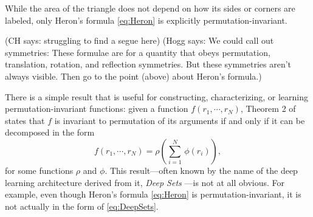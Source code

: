 \documentclass[12pt]{article}
\newcommand{\CH}[1]{{\color{blue} (CH says: #1)}}
\newcommand{\Hogg}[1]{{\color{violet} (Hogg says: #1)}}
\newcommand{\pseudosection}[1]
{\noindent{\color{green!66!black} (\textit{#1})}\par}
\begin{document}
While the area of the triangle does not depend on how its sides or corners are labeled,
only Heron's formula \eqref{eq:Heron} is explicitly permutation-invariant.

\CH{struggling to find a segue here} \Hogg{We could call out symmetries: These formulae are for a quantity that obeys permutation, translation, rotation, and reflection symmetries. But these symmetries aren't always visible. Then go to the point (above) about Heron's formula.}

\pseudosection{Deep Sets} There is a simple result that is useful for constructing, characterizing, or learning permutation-invariant functions:
given a function $f(r_1, \cdots, r_N)$, Theorem 2 of \citet{zaheer+17deepsets} states that $f$ is invariant to permutation of its arguments if and only if it can be decomposed in the form
\begin{equation}
    f(r_1, \cdots, r_N) = \rho \left( {\textstyle \sum_{i=1}^{N}} \, \phi(r_i) \right), \label{eq:DeepSets}
\end{equation}
for some functions $\rho$ and $\phi$. This result---often known by the name of the deep learning architecture derived from it, \emph{Deep Sets} \citep{zaheer+17deepsets}---is not at all obvious.
For example, even though Heron's formula \eqref{eq:Heron} is permutation-invariant, it is not actually in the form of \eqref{eq:DeepSets}. 

\end{document}
